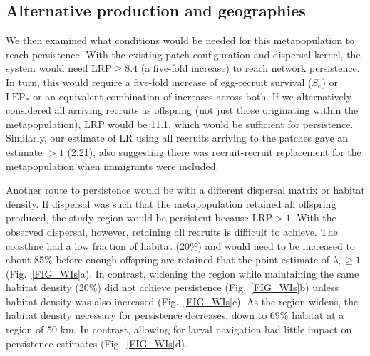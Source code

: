 \documentclass[12pt, oneside]{article}   	%
\begin{document}
\subsection*{Alternative production and geographies}

We then examined what conditions would be needed for this metapopulation to reach persistence. With the existing patch configuration and dispersal kernel, the system would need $\text{LRP} \geq 8.4$ (a five-fold increase) to reach network persistence. In turn, this would require a five-fold increase of egg-recruit survival ($S_e$) or $\text{LEP}_*$ or an equivalent combination of increases across both. If we alternatively considered all arriving recruits as offspring (not just those originating within the metapopulation), LRP would be 11.1, which would be sufficient for persistence. Similarly, our estimate of LR using all recruits arriving to the patches gave an estimate $> 1$ (2.21), also suggesting there was recruit-recruit replacement for the metapopulation when immigrants were included. 

Another route to persistence would be with a different dispersal matrix or habitat density. If dispersal was such that the metapopulation retained all offspring produced, the study region would be persistent because $\text{LRP} > 1$. With the observed dispersal, however, retaining all recruits is difficult to achieve. The coastline had a low fraction of habitat (20\%) and would need to be increased to about 85\% before enough offspring are retained that the point estimate of $\lambda_c \geq 1$ (Fig.\ \ref{FIG_WIs}a). In contrast, widening the region while maintaining the same habitat density (20\%) did not achieve persistence (Fig.\ \ref{FIG_WIs}b) unless habitat density was also increased (Fig.\ \ref{FIG_WIs}c). As the region widens, the habitat density necessary for persistence decreases, down to 69\% habitat at a region of 50 km. In contrast, allowing for larval navigation had little impact on persistence estimates (Fig.\ \ref{FIG_WIs}d).
\end{document}
